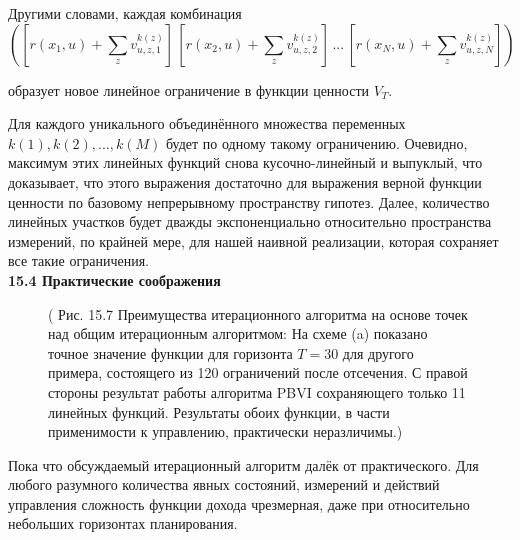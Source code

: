 \documentclass[10pt,a4paper]{article}
\begin{document}
Другими словами, каждая комбинация\\

$$\left( \left[r(x_1,u)+\sum_zv_{u,z,1}^{k(z)}\right] \,\left[r(x_2,u)+\sum_zv_{u,z,2}^{k(z)}\right]\,...\,\left[r(x_N,u)+\sum_zv_{u,z,N}^{k(z)}\right]\right) $$ 

образует новое линейное ограничение в функции ценности $V_T$.

Для каждого уникального объединённого множества переменных $k(1), k(2),... , k(M)$ будет по одному такому ограничению. Очевидно, максимум этих линейных функций снова кусочно-линейный и выпуклый, что доказывает, что этого выражения достаточно для выражения верной функции ценности по базовому непрерывному пространству гипотез. Далее, количество линейных участков будет дважды экспоненциально относительно пространства измерений, по крайней мере, для нашей наивной реализации, которая сохраняет все такие ограничения.\\

\textbf{15.4	Практические соображения}\\

\begin{figure}[H]
	\caption{ ( Рис. 15.7 Преимущества итерационного алгоритма на основе точек над общим итерационным алгоритмом: На схеме (a) показано точное значение функции для горизонта $T = 30$ для другого примера, состоящего из 120 ограничений после отсечения. С правой стороны результат работы алгоритма PBVI сохраняющего только 11 линейных функций. Результаты обоих функции, в части применимости к управлению, практически неразличимы.) }
	\label{fig:157orig}
\end{figure}

Пока что обсуждаемый  итерационный алгоритм далёк от практического. Для любого разумного количества явных состояний, измерений и действий управления сложность функции дохода чрезмерная, даже при относительно небольших горизонтах планирования.
\end{document}
